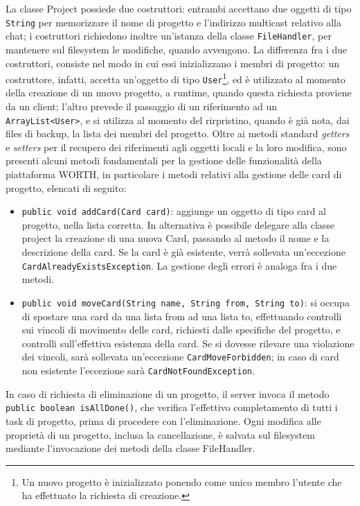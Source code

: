 \documentclass{article}
\begin{document}
La classe Project possiede due costruttori: entrambi accettano due oggetti di tipo \texttt{String} per memorizzare il nome di progetto e l'indirizzo multicast relativo alla chat; i costruttori richiedono inoltre un'istanza della classe \texttt{FileHandler}, per mantenere sul filesystem le modifiche, quando avvengono. La differenza fra i due costruttori, consiste nel modo in cui essi inizializzano i membri di progetto: un costruttore, infatti, accetta un'oggetto di tipo \texttt{User}\footnote{Un nuovo progetto è inizializzato ponendo come unico membro l'utente che ha effettuato la richiesta di creazione.}, ed è utilizzato al momento della creazione di un nuovo progetto, a runtime, quando questa richiesta proviene da un client; l'altro prevede il passaggio di un riferimento ad un \texttt{ArrayList<User>}, e si utilizza al momento del rirpristino, quando è già nota, dai files di backup, la lista dei membri del progetto.
Oltre ai metodi standard \emph{getters} e \emph{setters} per il recupero dei riferimenti agli oggetti locali e la loro modifica, sono presenti alcuni metodi fondamentali per la gestione delle funzionalità della piattaforma WORTH, in particolare i metodi relativi alla gestione delle card di progetto, elencati di seguito:
\begin{itemize}
    \item \texttt{public void addCard(Card card)}: aggiunge un oggetto di tipo card al progetto, nella lista corretta. In alternativa è possibile delegare alla classe project la creazione di una nuova Card, passando al metodo il nome e la descrizione della card. Se la card è già esistente, verrà sollevata un'eccezione \texttt{CardAlreadyExistsException}. La gestione degli errori è analoga fra i due metodi.
    \item \texttt{public void moveCard(String name, String from, String to)}: si occupa di spostare una card da una lista from ad una lista to, effettuando controlli sui vincoli di movimento delle card, richiesti dalle specifiche del progetto, e controlli sull'effettiva esistenza della card. Se si dovesse rilevare una violazione dei vincoli, sarà sollevata un'eccezione \texttt{CardMoveForbidden}; in caso di card non esistente l'eccezione sarà \texttt{CardNotFoundException}.
\end{itemize}
In caso di richiesta di eliminazione di un progetto, il server invoca il metodo \texttt{public boolean isAllDone()}, che verifica l'effettivo completamento di tutti i task di progetto, prima di procedere con l'eliminazione.
Ogni modifica alle proprietà di un progetto, inclusa la cancellazione, è salvata sul filesystem mediante l'invocazione dei metodi della classe FileHandler.
\end{document}
